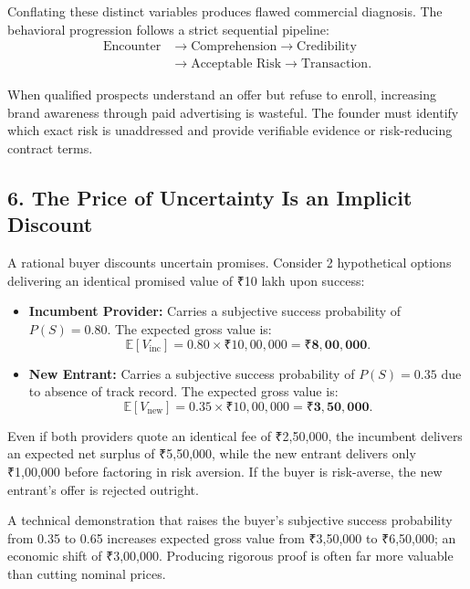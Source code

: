 Conflating these distinct variables produces flawed commercial diagnosis. The behavioral progression follows a strict sequential pipeline:
\begin{equation}
\begin{aligned}
\text{Encounter} &\longrightarrow \text{Comprehension} \longrightarrow \text{Credibility} \\
&\longrightarrow \text{Acceptable Risk} \longrightarrow \text{Transaction}.
\end{aligned}
\end{equation}

When qualified prospects understand an offer but refuse to enroll, increasing brand awareness through paid advertising is wasteful. The founder must identify which exact risk is unaddressed and provide verifiable evidence or risk-reducing contract terms.

\subsection*{6. The Price of Uncertainty Is an Implicit Discount}

A rational buyer discounts uncertain promises. Consider 2 hypothetical options delivering an identical promised value of ₹10 lakh upon success:
\begin{itemize}
\item \textbf{Incumbent Provider:} Carries a subjective success probability of $P(S) = 0.80$. The expected gross value is:
\begin{equation}
\mathbb{E}[V_{\text{inc}}] = 0.80 \times ₹10,00,000 = \mathbf{₹8,00,000}.
\end{equation}
\item \textbf{New Entrant:} Carries a subjective success probability of $P(S) = 0.35$ due to absence of track record. The expected gross value is:
\begin{equation}
\mathbb{E}[V_{\text{new}}] = 0.35 \times ₹10,00,000 = \mathbf{₹3,50,000}.
\end{equation}
\end{itemize}

Even if both providers quote an identical fee of ₹2,50,000, the incumbent delivers an expected net surplus of ₹5,50,000, while the new entrant delivers only ₹1,00,000 before factoring in risk aversion. If the buyer is risk-averse, the new entrant's offer is rejected outright. 

A technical demonstration that raises the buyer's subjective success probability from 0.35 to 0.65 increases expected gross value from ₹3,50,000 to ₹6,50,000; an economic shift of ₹3,00,000. Producing rigorous proof is often far more valuable than cutting nominal prices.

